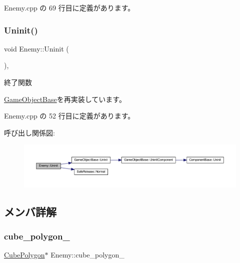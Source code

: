  Enemy.\+cpp の 69 行目に定義があります。

\mbox{\label{class_enemy_a9aeaa757abdf0c37fd67c4ce5aed6962}} 
\subsubsection{\texorpdfstring{Uninit()}{Uninit()}}
{\footnotesize\ttfamily void Enemy\+::\+Uninit (\begin{DoxyParamCaption}{ }\end{DoxyParamCaption})\hspace{0.3cm}{\ttfamily [override]}, {\ttfamily [virtual]}}



終了関数 



\mbox{\hyperlink{class_game_object_base_a97e1bc277d7b1c0156d4735de29a022c}{Game\+Object\+Base}}を再実装しています。



 Enemy.\+cpp の 52 行目に定義があります。

呼び出し関係図\+:\nopagebreak
\begin{figure}[H]
\begin{center}
\leavevmode
\includegraphics[width=350pt]{class_enemy_a9aeaa757abdf0c37fd67c4ce5aed6962_cgraph}
\end{center}
\end{figure}


\subsection{メンバ詳解}
\mbox{\label{class_enemy_a9a24b765d76b789cc678701886570511}} 
\subsubsection{\texorpdfstring{cube\+\_\+polygon\+\_\+}{cube\_polygon\_}}
{\footnotesize\ttfamily \mbox{\hyperlink{class_cube_polygon}{Cube\+Polygon}}$\ast$ Enemy\+::cube\+\_\+polygon\+\_\+}



